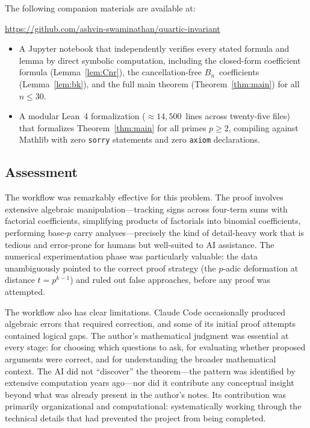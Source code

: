 \documentclass[10pt]{amsart}
\theoremstyle{definition}
\theoremstyle{remark}
\begin{document}
The following companion materials are available at:
\begin{center}
\url{https://github.com/ashvin-swaminathan/quartic-invariant}
\end{center}
\begin{itemize}
\item A Jupyter notebook that independently verifies every stated formula
and lemma by direct symbolic computation, including the closed-form
coefficient formula (Lemma~\ref{lem:Cnr}), the cancellation-free
$B_n$~coefficients (Lemma~\ref{lem:bk}), and the full main theorem
(Theorem~\ref{thm:main}) for all $n \le 30$.
\item A modular Lean~4 formalization ($\approx 14{,}500$~lines across
twenty-five files) that formalizes Theorem~\ref{thm:main} for
all primes $p \ge 2$, compiling against Mathlib with zero
\texttt{sorry} statements and zero \texttt{axiom} declarations.
\end{itemize}

\subsection*{Assessment}

The workflow was remarkably effective for this problem.  The proof
involves extensive algebraic manipulation---tracking signs across
four-term sums with factorial coefficients, simplifying products of
factorials into binomial coefficients, performing base-$p$ carry
analyses---precisely the kind of detail-heavy work that is tedious
and error-prone for humans but well-suited to AI assistance.
The numerical experimentation phase was particularly valuable:
the data unambiguously pointed to the correct proof strategy (the
$p$-adic deformation at distance $t = p^{k-1}$) and ruled out
false approaches, before any proof was attempted.

The workflow also has clear limitations.  Claude Code occasionally
produced algebraic errors that required correction, and some of
its initial proof attempts contained logical gaps.  The author's
mathematical judgment was essential at every stage: for choosing
which questions to ask, for evaluating whether proposed arguments
were correct, and for understanding the broader mathematical context.
The AI did not ``discover'' the theorem---the pattern was identified
by extensive computation years ago---nor did it contribute any
conceptual insight beyond what was already present in the author's
notes.  Its contribution was primarily organizational and
computational: systematically working through the technical details
that had prevented the project from being completed.
\end{document}
